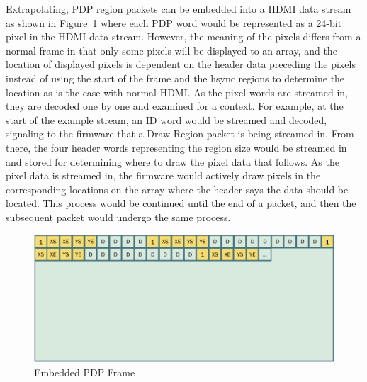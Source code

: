     Extrapolating, PDP region packets can be embedded into a HDMI data stream as shown in Figure~\ref{fig:embedded_frame} where each PDP word would be represented as a 24-bit pixel in the HDMI data stream. However, the meaning of the pixels differs from a normal frame in that only some pixels will be displayed to an array, and the location of displayed pixels is dependent on the header data preceding the pixels instead of using the start of the frame and the hsync regions to determine the location as is the case with normal HDMI. As the pixel words are streamed in, they are decoded one by one and examined for a context. For example, at the start of the example stream, an ID word would be streamed and decoded, signaling to the firmware that a Draw Region packet is being streamed in. From there, the four header words representing the region size would be streamed in and stored for determining where to draw the pixel data that follows. As the pixel data is streamed in, the firmware would actively draw pixels in the corresponding locations on the array where the header says the data should be located. This process would be continued until the end of a packet, and then the subsequent packet would undergo the same process.

    \begin{figure}
        \centering
        \includegraphics[width=1.0\textwidth]{fig/embedded_frame.pdf}
        \caption{Embedded PDP Frame}
        \label{fig:embedded_frame}
    \end{figure}

